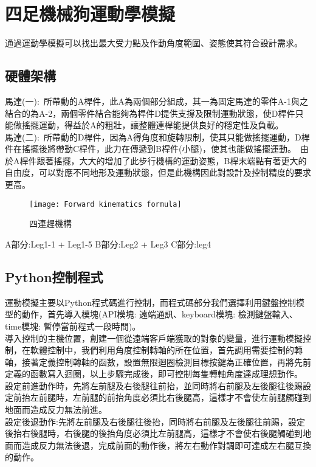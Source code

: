 \chapter{四足機械狗運動學模擬}

通過運動學模擬可以找出最大受力點及作動角度範圍、姿態使其符合設計需求。\\

\section{硬體架構}

馬達(一):\
所帶動的A桿件，此A為兩個部分組成，其一為固定馬達的零件A-1與之結合的為A-2，兩個零件結合能夠為桿件D提供支撐及限制運動狀態，使D桿件只能做搖擺運動，得益於A的粗壯，讓整體連桿能提供良好的穩定性及負載。\\
馬達(二):\
所帶動的D桿件，因為A得角度和旋轉限制，使其只能做搖擺運動，D桿件在搖擺後將帶動C桿件，此力在傳遞到B桿件(小腿)，使其也能做搖擺運動。\
由於A桿件跟著搖擺，大大的增加了此步行機構的運動姿態，B桿末端點有著更大的自由度，可以對應不同地形及運動狀態，但是此機構因此對設計及控制精度的要求更高。\\

\begin{figure}[hbt!]
\begin{center}
\texttt{[image: Forward kinematics formula]}
\caption{\Large 四連趕機構}\label{Forward kinematics formula}
\end{center}
\end{figure}

A部分:Leg1-1 + Leg1-5
B部分:Leg2 + Leg3
C部分:leg4

\section{Python控制程式}
運動模擬主要以Python程式碼進行控制，而程式碼部分我們選擇利用鍵盤控制模型的動作，首先導入模塊(API模塊: 遠端通訊、keyboard模塊: 檢測鍵盤輸入、time模塊: 暫停當前程式一段時間)。\\
導入控制的主機位置，創建一個從遠端客戶端獲取的對象的變量，進行運動模擬控制，在軟體控制中，我們利用角度控制轉軸的所在位置，首先調用需要控制的轉軸，接著定義控制轉軸的函數，設置無限迴圈檢測目標按鍵為正確位置，再將先前定義的函數寫入迴圈，以上步驟完成後，即可控制每隻轉軸角度達成理想動作。\\
設定前進動作時，先將左前腿及右後腿往前抬，並同時將右前腿及左後腿往後踢設定前抬左前腿時，左前腿的前抬角度必須比右後腿高，這樣才不會使左前腿觸碰到地面而造成反力無法前進。\\
設定後退動作:先將左前腿及右後腿往後抬，同時將右前腿及左後腿往前踢，設定後抬右後腿時，右後腿的後抬角度必須比左前腿高，這樣才不會使右後腿觸碰到地面而造成反力無法後退，完成前面的動作後，將左右動作對調即可達成左右腿互換的動作。\\

